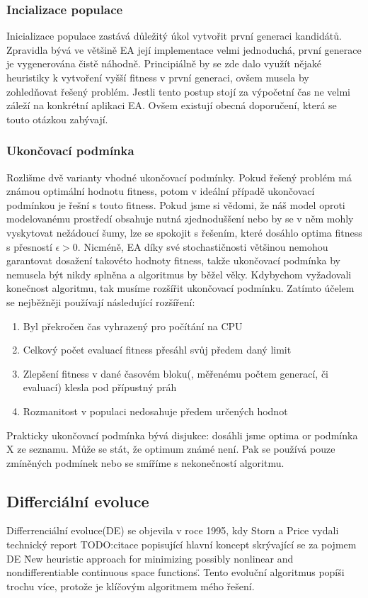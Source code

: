 \subsubsection{Incializace populace}
Inicializace populace zastává důležitý úkol vytvořit první generaci kandidátů. Zpravidla bývá ve většině EA její implementace velmi jednoduchá, první generace je vygenerována čistě náhodně. Principiálně by se zde dalo využít nějaké heuristiky k vytvoření vyšší fitness v první generaci, ovšem musela by zohledňovat řešený problém. Jestli tento postup stojí za výpočetní čas ne velmi záleží na konkrétní aplikaci EA. Ovšem existují obecná doporučení, která se touto otázkou zabývají. 
\subsubsection{Ukončovací podmínka}
Rozlišme dvě varianty vhodné ukončovací podmínky. Pokud řešený problém má známou optimální hodnotu fitness, potom v ideální případě ukončovací podmínkou je řešní s touto fitness. Pokud jsme si vědomi, že náš model oproti modelovanému prostředí obsahuje nutná zjednoduššení nebo by se v něm mohly vyskytovat nežádoucí šumy, lze se spokojit s řešením, které dosáhlo optima fitness s přesností $\epsilon > 0$. Nicméně, EA díky své stochastičnosti většinou nemohou garantovat dosažení takovéto hodnoty fitness, takže ukončovací podmínka by nemusela být nikdy splněna a algoritmus by běžel věky. Kdybychom vyžadovali konečnost algoritmu, tak musíme rozšířit ukončovací podmínku. Zatímto účelem se nejběžněji používají následující rozšíření: \par
\begin{enumerate}
\item Byl překročen čas vyhrazený pro počítání na CPU
\item Celkový počet evaluací fitness přesáhl svůj předem daný limit 
\item Zlepšení fitness v dané časovém bloku(, měřenému počtem generací, či evaluací) klesla pod přípustný práh
\item Rozmanitost v populaci nedosahuje předem určených hodnot
\end{enumerate}
Prakticky ukončovací podmínka bývá disjukce: dosáhli jsme optima or podmínka X ze seznamu. Může se stát, že optimum známé není. Pak se používá pouze zmíněných podmínek nebo se smíříme s nekonečností algoritmu. 
\subsection{Differciální evoluce}
Differrenciální evoluce(DE) se objevila v roce 1995, kdy Storn a Price vydali technický report TODO:citace popisující hlavní koncept skrývající se za pojmem DE \"New heuristic approach for minimizing possibly nonlinear and nondifferentiable continuous space functions\". Tento evoluční algoritmus popíši trochu více, protože je klíčovým algoritmem mého řešení. 

